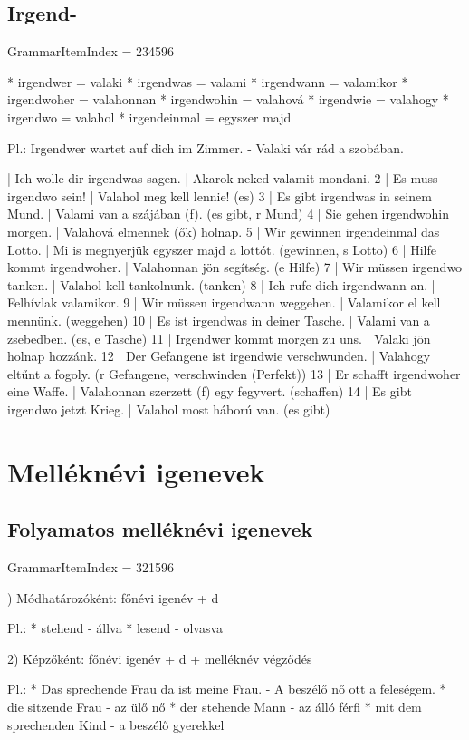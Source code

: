 \documentclass{article}
\newenvironment{desc}{\verbatim}{\endverbatim}
\newenvironment{exmp}{\verbatim}{\endverbatim}
\begin{document}
\subsection{Irgend-}

GrammarItemIndex = 234596

\begin{desc}
* irgendwer = valaki
* irgendwas = valami
* irgendwann = valamikor
* irgendwoher = valahonnan
* irgendwohin = valahová
* irgendwie = valahogy
* irgendwo = valahol
* irgendeinmal = egyszer majd

Pl.: Irgendwer wartet auf dich im Zimmer. - Valaki vár rád a szobában.
\end{desc}

\begin{exmp}
1 | Ich wolle dir irgendwas sagen. | Akarok neked valamit mondani.
2 | Es muss irgendwo sein! | Valahol meg kell lennie! (es)
3 | Es gibt irgendwas in seinem Mund. | Valami van a szájában (f). (es gibt, r Mund)
4 | Sie gehen irgendwohin morgen. | Valahová elmennek (ők) holnap.
5 | Wir gewinnen irgendeinmal das Lotto. | Mi is megnyerjük egyszer majd a lottót. (gewinnen, s Lotto)
6 | Hilfe kommt irgendwoher. | Valahonnan jön segítség. (e Hilfe)
7 | Wir müssen irgendwo tanken. | Valahol kell tankolnunk. (tanken)
8 | Ich rufe dich irgendwann an. | Felhívlak valamikor.
9 | Wir müssen irgendwann weggehen. | Valamikor el kell mennünk. (weggehen)
10 | Es ist irgendwas in deiner Tasche. | Valami van a zsebedben. (es, e Tasche)
11 | Irgendwer kommt morgen zu uns. | Valaki jön holnap hozzánk.
12 | Der Gefangene ist irgendwie verschwunden. | Valahogy eltűnt a fogoly. (r Gefangene, verschwinden (Perfekt))
13 | Er schafft irgendwoher eine Waffe. | Valahonnan szerzett (f) egy fegyvert. (schaffen)
14 | Es gibt irgendwo jetzt Krieg. | Valahol most háború van. (es gibt)
\end{exmp}

\section{Melléknévi igenevek}

\subsection{Folyamatos melléknévi igenevek}

GrammarItemIndex = 321596

\begin{desc}
1) Módhatározóként: főnévi igenév + d

Pl.: * stehend - állva
* lesend - olvasva

2) Képzőként: főnévi igenév + d + melléknév végződés

Pl.: * Das sprechende Frau da ist meine Frau. - A beszélő nő ott a feleségem.
* die sitzende Frau - az ülő nő
* der stehende Mann - az álló férfi
* mit dem sprechenden Kind - a beszélő gyerekkel
\end{desc}
\end{document}
